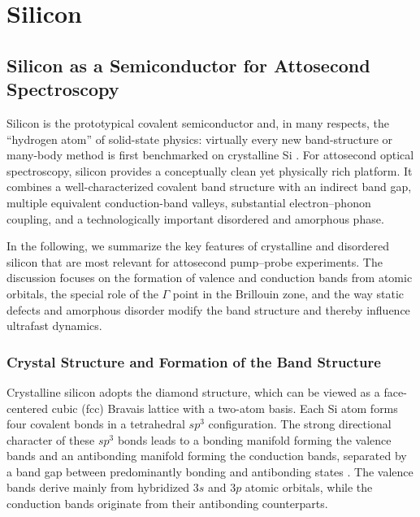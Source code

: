\chapter{Silicon}
\label{chap:silicon}





\section{Silicon as a Semiconductor for Attosecond Spectroscopy}

Silicon is the prototypical covalent semiconductor and, in many respects, the “hydrogen atom” of solid-state physics: virtually every new band-structure or many-body method is first benchmarked on crystalline Si \cite{YuCardona2010, Robertson01011983}. For attosecond optical spectroscopy, silicon provides a conceptually clean yet physically rich platform. It combines a well-characterized covalent band structure with an indirect band gap, multiple equivalent conduction-band valleys, substantial electron–phonon coupling, and a technologically important disordered and amorphous phase.

In the following, we summarize the key features of crystalline and disordered silicon that are most relevant for attosecond pump–probe experiments. The discussion focuses on the formation of valence and conduction bands from atomic orbitals, the special role of the $\Gamma$ point in the Brillouin zone, and the way static defects and amorphous disorder modify the band structure and thereby influence ultrafast dynamics.

\subsection{Crystal Structure and Formation of the Band Structure}

Crystalline silicon adopts the diamond structure, which can be viewed as a face-centered cubic (fcc) Bravais lattice with a two-atom basis. Each Si atom forms four covalent bonds in a tetrahedral $sp^3$ configuration. The strong directional character of these $sp^3$ bonds leads to a bonding manifold forming the valence bands and an antibonding manifold forming the conduction bands, separated by a band gap between predominantly bonding and antibonding states \cite{Robertson01011983}. The valence bands derive mainly from hybridized $3s$ and $3p$ atomic orbitals, while the conduction bands originate from their antibonding counterparts.

